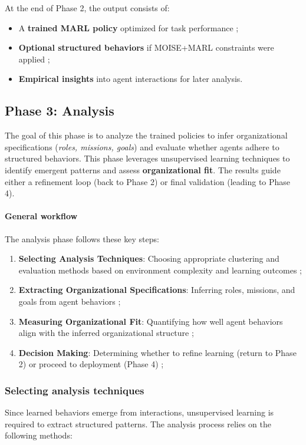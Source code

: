\documentclass[pdflatex,sn-mathphys-num]{sn-jnl}%
\theoremstyle{thmstyleone}%
\theoremstyle{thmstyletwo}%
\theoremstyle{thmstylethree}%
\begin{document}
At the end of Phase 2, the output consists of:
\begin{itemize}
    \item A \textbf{trained MARL policy} optimized for task performance ;
    \item \textbf{Optional structured behaviors} if MOISE+MARL constraints were applied ;
    \item \textbf{Empirical insights} into agent interactions for later analysis.
\end{itemize}

\subsection{Phase 3: Analysis}

The goal of this phase is to analyze the trained policies to infer organizational specifications (\textit{roles, missions, goals}) and evaluate whether agents adhere to structured behaviors. This phase leverages unsupervised learning techniques to identify emergent patterns and assess \textbf{organizational fit}. The results guide either a refinement loop (back to Phase 2) or final validation (leading to Phase 4).

\paragraph{\textbf{General workflow}} 
The analysis phase follows these key steps:
\begin{enumerate}
    \item \textbf{Selecting Analysis Techniques}: Choosing appropriate clustering and evaluation methods based on environment complexity and learning outcomes ;
    \item \textbf{Extracting Organizational Specifications}: Inferring roles, missions, and goals from agent behaviors ;
    \item \textbf{Measuring Organizational Fit}: Quantifying how well agent behaviors align with the inferred organizational structure ;
    \item \textbf{Decision Making}: Determining whether to refine learning (return to Phase 2) or proceed to deployment (Phase 4) ;
\end{enumerate}

\subsubsection{Selecting analysis techniques}
Since learned behaviors emerge from interactions, unsupervised learning is required to extract structured patterns. The analysis process relies on the following methods:
\end{document}

